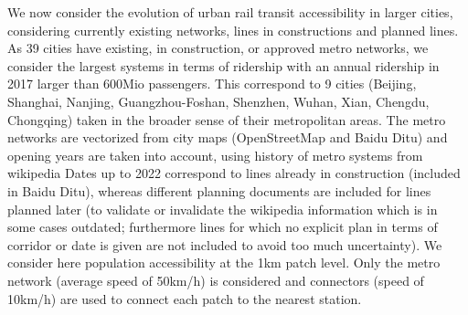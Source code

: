 

We now consider the evolution of urban rail transit accessibility in larger cities, considering currently existing networks, lines in constructions and planned lines. As 39 cities have existing, in construction, or approved metro networks, we consider the largest systems in terms of ridership with an annual ridership in 2017 larger than 600Mio passengers. This correspond to 9 cities (Beijing, Shanghai, Nanjing, Guangzhou-Foshan, Shenzhen, Wuhan, Xian, Chengdu, Chongqing) taken in the broader sense of their metropolitan areas. The metro networks are vectorized from city maps (OpenStreetMap and Baidu Ditu) and opening years are taken into account, using history of metro systems from wikipedia Dates up to 2022 correspond to lines already in construction (included in Baidu Ditu), whereas different planning documents are included for lines planned later (to validate or invalidate the wikipedia information which is in some cases outdated; furthermore lines for which no explicit plan in terms of corridor or date is given are not included to avoid too much uncertainty). We consider here population accessibility at the 1km patch level. Only the metro network (average speed of 50km/h) is considered and connectors (speed of 10km/h) are used to connect each patch to the nearest station.




